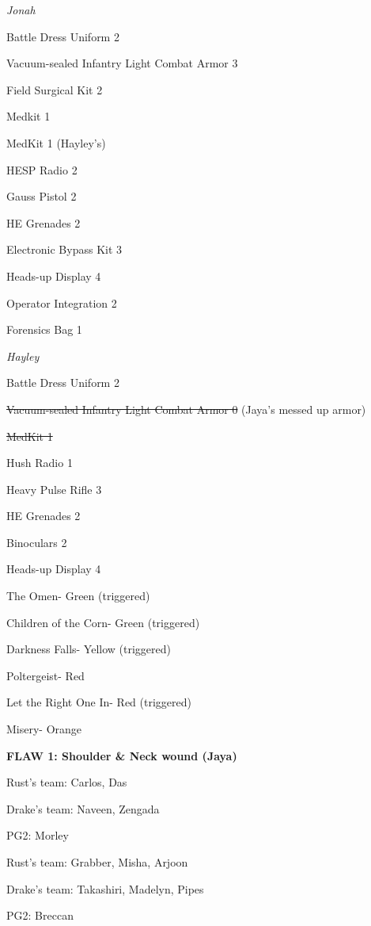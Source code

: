\textit{Jonah}

{\parskip=0pt
Battle Dress Uniform 2

Vacuum-sealed Infantry Light Combat Armor 3

Field Surgical Kit 2

Medkit 1

MedKit 1 (Hayley's)

HESP Radio 2

Gauss Pistol 2

HE Grenades 2

Electronic Bypass Kit 3

Heads-up Display 4

Operator Integration 2

Forensics Bag 1
}


\textit{Hayley}

{\parskip=0pt
Battle Dress Uniform 2

\sout{ Vacuum-sealed Infantry Light Combat Armor 0 } (Jaya's messed up armor)

\sout{ MedKit 1 }

Hush Radio 1

Heavy Pulse Rifle 3

HE Grenades 2

Binoculars 2

Heads-up Display 4
}


The Omen- Green (triggered)

Children of the Corn- Green (triggered)

Darkness Falls- Yellow (triggered)

Poltergeist- Red

Let the Right One In- Red (triggered)

Misery- Orange



\textbf{ {\color[RGB]{255,0,0}FLAW 1: Shoulder \& Neck wound (Jaya)} }



{\parskip=0pt
Rust's team: Carlos, Das

Drake's team: Naveen, Zengada

PG2: Morley
}


{\parskip=0pt
Rust's team: Grabber, Misha, Arjoon

Drake's team: Takashiri, Madelyn, Pipes 

PG2: Breccan
}

